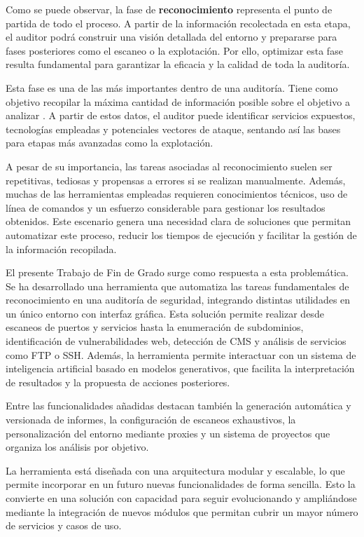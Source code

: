 \begin{parskipenv}
Como se puede observar, la fase de \textbf{reconocimiento} representa el punto de partida de todo el proceso. A partir de la información recolectada en esta etapa, el auditor podrá construir una visión detallada del entorno y prepararse para fases posteriores como el escaneo o la explotación. Por ello, optimizar esta fase resulta fundamental para garantizar la eficacia y la calidad de toda la auditoría.

Esta fase es una de las más importantes dentro de una auditoría. Tiene como objetivo recopilar la máxima cantidad de información posible sobre el objetivo a analizar \cite{recon}. A partir de estos datos, el auditor puede identificar servicios expuestos, tecnologías empleadas y potenciales vectores de ataque, sentando así las bases para etapas más avanzadas como la explotación.

A pesar de su importancia, las tareas asociadas al reconocimiento suelen ser repetitivas, tediosas y propensas a errores si se realizan manualmente. Además, muchas de las herramientas empleadas requieren conocimientos técnicos, uso de línea de comandos y un esfuerzo considerable para gestionar los resultados obtenidos. Este escenario genera una necesidad clara de soluciones que permitan automatizar este proceso, reducir los tiempos de ejecución y facilitar la gestión de la información recopilada.

El presente Trabajo de Fin de Grado surge como respuesta a esta problemática. Se ha desarrollado una herramienta que automatiza las tareas fundamentales de reconocimiento en una auditoría de seguridad, integrando distintas utilidades en un único entorno con interfaz gráfica. Esta solución permite realizar desde escaneos de puertos y servicios hasta la enumeración de subdominios, identificación de vulnerabilidades web, detección de CMS y análisis de servicios como FTP o SSH. Además, la herramienta permite interactuar con un sistema de inteligencia artificial basado en modelos generativos, que facilita la interpretación de resultados y la propuesta de acciones posteriores.

Entre las funcionalidades añadidas destacan también la generación automática y versionada de informes, la configuración de escaneos exhaustivos, la personalización del entorno mediante proxies y un sistema de proyectos que organiza los análisis por objetivo.

La herramienta está diseñada con una arquitectura modular y escalable, lo que permite incorporar en un futuro nuevas funcionalidades de forma sencilla. Esto la convierte en una solución con capacidad para seguir evolucionando y ampliándose mediante la integración de nuevos módulos que permitan cubrir un mayor número de servicios y casos de uso.


\end{parskipenv}
